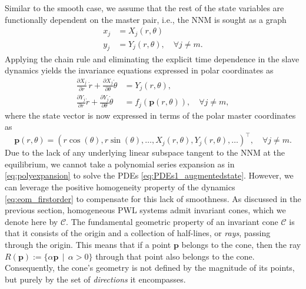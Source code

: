 \documentclass[a4paper,9pt,parskip=half,english]{article}
\theoremstyle{plain}
\theoremstyle{definition}
\newcommand{\T}{^{\!\top}} %
\newcommand{\vp}{\mathbf p}
\begin{document}
Similar to the smooth case, we assume that the rest of the state variables are functionally dependent on the master pair, i.e., the NNM is sought as a graph
\begin{equation}
	\begin{aligned}
	x_j &= X_j(r,\theta) \\ 
	y_j &= Y_j(r,\theta), \quad \forall j \neq m.
	\end{aligned}
\end{equation} 
Applying the chain rule and eliminating the explicit time dependence in the slave dynamics yields the invariance equations expressed in polar coordinates as
\begin{equation}
\begin{aligned}\label{eq:PDEs1_augmentedstate}
\frac{\partial X_{j}} {\partial r} \, \dot{r}
+\frac{\partial X_{j}}{\partial \theta} \dot{\theta}
&=Y_{j}(r,\theta), \\  
\frac{\partial Y_{j}}{\partial r} \dot{r}
+\frac{\partial Y_{j}}{\partial \theta } \dot{\theta}
&= f_{j}(\vp(r,\theta)), \quad \forall j \neq m,
\end{aligned}
\end{equation}
where the state vector is now expressed in terms of the polar master coordinates as 
\begin{equation}
\vp(r,\theta)=(r \cos(\theta), r\sin(\theta), \ldots, X_j(r,\theta), Y_j(r,\theta), \ldots )\T, \quad \forall j \neq m. 
\end{equation}
Due to the lack of any underlying linear subspace tangent to the NNM at the equilibrium, we cannot take a polynomial series expansion as in \eqref{eq:polyexpansion} to solve the PDEs \eqref{eq:PDEs1_augmentedstate}. However, we can leverage the positive homogeneity property of the dynamics \eqref{eq:eom_firstorder} to compensate for this lack of smoothness. As discussed in the previous section, homogeneous PWL systems admit invariant cones, which we denote here by $\mathcal{C}$. The fundamental geometric property of an invariant cone $\mathcal{C}$ is that it consists of the origin and a collection of half-lines, or \textit{rays}, passing through the origin. This means that if a point $\vp$ belongs to the cone, then the ray $R(\vp) := \{ \alpha \vp \, \mid \, \alpha > 0\}$ through that point also belongs to the cone. Consequently, the cone's geometry is not defined by the magnitude of its points, but purely by the set of \textit{directions} it encompasses.
\end{document}
